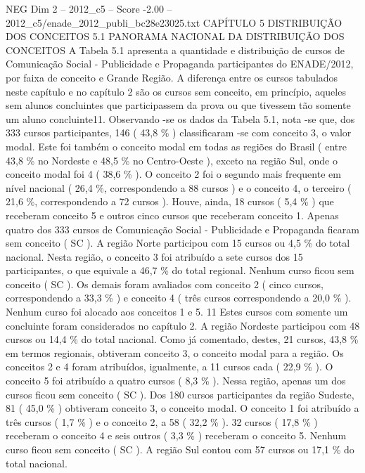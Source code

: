 \begin{textsample}{NEG Dim 2 – 2012\_c5 – Score -2.00 – 2012\_c5/enade\_2012\_publi\_bc28e23025.txt}  \label{ex:f2_neg_079}
CAPÍTULO 5 DISTRIBUIÇÃO DOS CONCEITOS 5.1 PANORAMA NACIONAL DA DISTRIBUIÇÃO DOS CONCEITOS A Tabela 5.1 apresenta a quantidade e distribuição de cursos de Comunicação Social - Publicidade e Propaganda participantes do ENADE/2012, por faixa de conceito e Grande Região.
A diferença entre os cursos tabulados neste capítulo e no capítulo 2 são os cursos sem conceito, em princípio, aqueles sem alunos concluintes que participassem da prova ou que tivessem tão somente um aluno concluinte11.
Observando -se os dados da Tabela 5.1, nota -se que, dos 333 cursos participantes, 146 ( 43,8 \% ) classificaram -se com conceito 3, o valor modal.
Este foi também o conceito modal em todas as regiões do Brasil ( entre 43,8 \% no Nordeste e 48,5 \% no Centro-Oeste ), exceto na região Sul, onde o conceito modal foi 4 ( 38,6 \% ).
O conceito 2 foi o segundo mais frequente em nível nacional ( 26,4 \%, correspondendo a 88 cursos ) e o conceito 4, o terceiro ( 21,6 \%, correspondendo a 72 cursos ).
Houve, ainda, 18 cursos ( 5,4 \% ) que receberam conceito 5 e outros cinco cursos que receberam conceito 1.
Apenas quatro dos 333 cursos de Comunicação Social - Publicidade e Propaganda ficaram sem conceito ( SC ).
A região Norte participou com 15 cursos ou 4,5 \% do total nacional.
Nesta região, o conceito 3 foi atribuído a sete cursos dos 15 participantes, o que equivale a 46,7 \% do total regional.
Nenhum curso ficou sem conceito ( SC ).
Os demais foram avaliados com conceito 2 ( cinco cursos, correspondendo a 33,3 \% ) e conceito 4 ( três cursos correspondendo a 20,0 \% ).
Nenhum curso foi alocado aos conceitos 1 e 5. 11 Estes cursos com somente um concluinte foram considerados no capítulo 2.
A região Nordeste participou com 48 cursos ou 14,4 \% do total nacional.
Como já comentado, destes, 21 cursos, 43,8 \% em termos regionais, obtiveram conceito 3, o conceito modal para a região.
Os conceitos 2 e 4 foram atribuídos, igualmente, a 11 cursos cada ( 22,9 \% ).
O conceito 5 foi atribuído a quatro cursos ( 8,3 \% ).
Nessa região, apenas um dos cursos ficou sem conceito ( SC ).
Dos 180 cursos participantes da região Sudeste, 81 ( 45,0 \% ) obtiveram conceito 3, o conceito modal.
O conceito 1 foi atribuído a três cursos ( 1,7 \% ) e o conceito 2, a 58 ( 32,2 \% ). 32 cursos ( 17,8 \% ) receberam o conceito 4 e seis outros ( 3,3 \% ) receberam o conceito 5.
Nenhum curso ficou sem conceito ( SC ).
A região Sul contou com 57 cursos ou 17,1 \% do total nacional.

\end{textsample}
